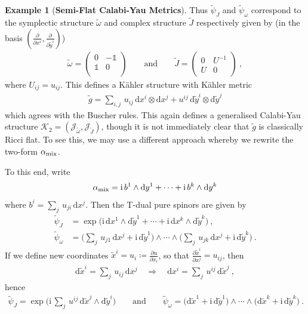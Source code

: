 \documentclass[a4paper, reqno, 11pt]{amsart}
\numberwithin{equation}{section}
\theoremstyle{definition}
\newtheorem{example}[equation]{Example}
\newcommand{\de}{\mathrm{d}}
\newcommand{\ii}{\mathrm{i}}
\newcommand{\cK}{{\mathcal K}}
\newcommand{\cJ}{{\mathcal J}}
\newcommand{\unit}{\mathds{1}}   			%
\theoremstyle{remark}
\begin{document}
\begin{example}[\textbf{Semi-Flat Calabi-Yau Metrics}]
    Thus $\tilde \psi_J$ and $\tilde \psi_\omega$ correspond to the symplectic structure $\tilde \omega$ and complex structure $\tilde J$ respectively given by (in the basis $(\tfrac\partial{\partial x^i},\tfrac\partial{\partial\tilde y^i})$)
    \begin{align}
        \tilde \omega = \begin{pmatrix}
            0 & -\unit\\
            \unit & 0 \\
        \end{pmatrix} \qquad \text{and} \qquad
        \tilde J = \begin{pmatrix}
            0 & U^{-1}\\
            U & 0
        \end{pmatrix} \ ,
    \end{align}
    where $U_{ij} = u_{ij}$. This defines a K\"ahler structure with K\"ahler metric
    \begin{align}
         \tilde g = \sum_{i,j}\, u_{ij}\,\de x^i \otimes \de x^j + u^{ij}\,\de \tilde y^i \otimes \de\tilde y^j
    \end{align}
    which agrees with the Buscher rules. This again defines a generalised Calabi-Yau structure $\cK_2=(\cJ_{\tilde\omega},\cJ_{\tilde J})$, though it is not immediately clear that $\tilde g$ is classically Ricci flat. To see this, we may use a different approach whereby we rewrite the two-form $\alpha_{\rm mix}$.

    To this end, write
    \begin{align}
        \alpha_{\rm mix} = \ii\,b^1 \wedge \de y^1 +\cdots + \ii\,b^k \wedge \de y^k
    \end{align}
    where $b^i = \sum_j\,u_{ji}\, \de x^j $. Then the T-dual pure spinors are given by
    \begin{align}
        {\tilde \psi}_J &= \exp\big(\ii\, \de x^1 \wedge \de \tilde y^1 +\cdots + \ii\,\de x^k \wedge \de \tilde y^k\big) \ , \\[4pt]
        {\tilde \psi}_\omega &= \Big( \sum_j\, u_{j1}\, \de x^j + \ii\,\de \tilde y^1\big) \wedge \cdots \wedge \Big(\sum_j\, u_{jk}\, \de x^j + \ii\,\de \tilde y^k\Big) \ .
    \end{align}
    If we define new coordinates $\tilde x^i = u_i \coloneqq \frac{\partial u}{\partial x_i}$, so that $\frac{\partial \tilde x^i}{\partial x^j} = u_{ij}$, then 
    \begin{align}
        \de \tilde x^i = \sum_j\,u_{ij}\, \de x^j \quad \Longrightarrow \quad \de x^i =\sum_j\,u^{ij}\, \de \tilde x^j \ ,
    \end{align}
     hence
    \begin{align}
        {\tilde \psi}_J = \exp\Big(\ii\, \sum_j\, u^{ij}\,\de \tilde x^j \wedge \de \tilde y^i\Big) \qquad \text{and} \qquad
        {\tilde \psi}_\omega = \big( \de \tilde x^1 + \ii\,\de \tilde y^1\big) \wedge \cdots \wedge \big(\de \tilde x^k + \ii\,\de \tilde y^k\big) \ .
    \end{align}
    

\end{example}
\end{document}
